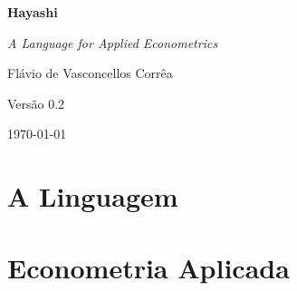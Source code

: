 \documentclass[12pt, a4paper, twoside, openright]{book}
\newcommand{\version}{0.2}
\begin{document}
\begin{titlepage}
  \centering
  \vspace*{3cm}
  {\Huge\bfseries\color{hayblue} Hayashi \par}
  \vspace{0.5cm}
  {\large\itshape A Language for Applied Econometrics \par}
  \vspace{2cm}
  {\large Flávio de Vasconcellos Corrêa \par}
  \vspace{1cm}
  {\normalsize Versão \version{} \par}
  \vfill
  {\small \today \par}
\end{titlepage}

\cleardoublepage

\frontmatter


\tableofcontents
\cleardoublepage

\mainmatter

\part{A Linguagem}


















\part{Econometria Aplicada}





\backmatter


\end{document}
